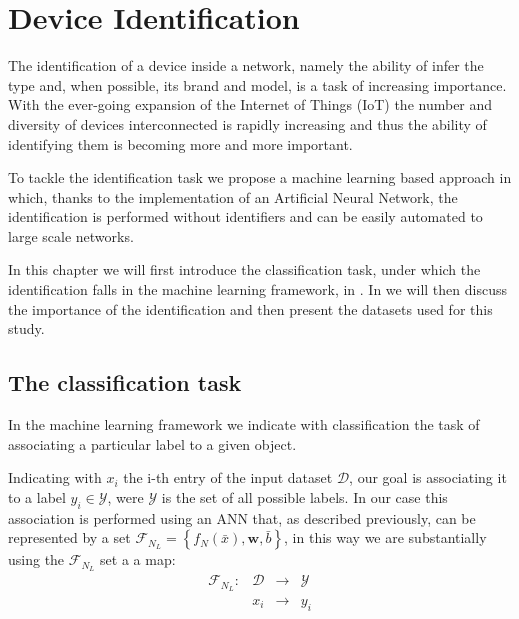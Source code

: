 \chapter{Device Identification}

The identification of a device inside a network, namely the ability of infer the type
and, when possible, its brand and model, is a task of increasing importance. With the ever-going expansion of the Internet of Things (IoT) the number and diversity of devices interconnected is rapidly increasing and thus the ability of identifying them is becoming more and more important.

To tackle the identification task we propose a machine learning based approach in which, thanks to the implementation of an Artificial Neural Network, the identification is performed without identifiers and can be easily automated to large scale networks. 

In this chapter we will first introduce the classification task, under which the identification falls in the machine learning framework, in . In  we will then discuss the importance of the identification and then present the datasets used for this study.

\section{The classification task}\label{classification}

In the machine learning framework we indicate with classification the task of associating a particular label to a given object. 

Indicating with $x_i$ the i-th entry of the input dataset $\mathcal{D}$, our goal is associating it to a label $y_i\in\mathcal{Y}$, were $\mathcal{Y}$ is the set of all possible labels. In our case this association is performed using an ANN that, as described previously, can be represented by a set $\mathcal{F}_{N_L} = \left\{ f_N(\bar{x}), \boldsymbol{w}, \bar{b}\right\}$, in this way we are substantially using the $\mathcal{F}_{N_L}$ set a a map:
\begin{equation}
    \begin{aligned}
        \mathcal{F}_{N_L}: & \mathcal{D} &\to & \mathcal{Y} \\
        & x_i &\to & y_i \\
    \end{aligned}
\end{equation}

